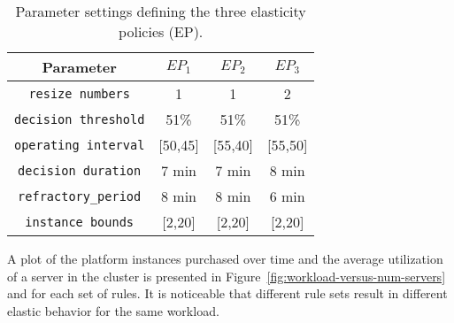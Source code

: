 \begin{table}[h]
\center
\begin{tabular}{ ||c || c | c | c| }
  \hline
   Parameter & $EP_1$ & $EP_2$ & $EP_3$ \\
   \hline \hline                       
   \texttt{resize numbers}      & 1 & 1 & 2  \\
   \texttt{decision threshold}	& 51\% & 51\% & 51\% \\
   \texttt{operating interval}	& [50,45] & [55,40] & [55,50] \\
   \texttt{decision duration} 	& 7 min & 7 min & 8 min \\ 	
   \texttt{refractory\_period} 	& 8 min & 8 min & 6 min \\
   \texttt{instance bounds}	& [2,20] & [2,20] & [2,20] \\
  \hline  \hline
\end{tabular}
\caption{Parameter settings defining the three elasticity policies (EP).}\label{tab:ps}
\end{table}
 
 A plot of the platform instances purchased over time and the average utilization of a server in the cluster is presented in Figure~\ref{fig:workload-versus-num-servers} and  for each set of rules. 
It is noticeable that different rule sets result in different elastic behavior for the same workload.  



%   

